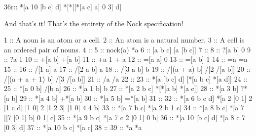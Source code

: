 \begin{code}
36r::    *[a 10 [b c] d]  *[*[[*[a c] a] 0 3] d]
\end{code}

And that's it! That's the entirety of the Nock specification! 

\begin{code}
1  ::    A noun is an atom or a cell.
2  ::    An atom is a natural number.
3  ::    A cell is an ordered pair of nouns.
4  ::
5  ::    nock(a)          *a
6  ::    [a b c]          [a [b c]]
7  ::
8  ::    ?[a b]           0
9  ::    ?a               1
10 ::    +[a b]           +[a b]
11 ::    +a               1 + a
12 ::    =[a a]           0
13 ::    =[a b]           1
14 ::    =a               =a
15 ::
16 ::    /[1 a]           a
17 ::    /[2 a b]         a
18 ::    /[3 a b]         b
19 ::    /[(a + a) b]     /[2 /[a b]]
20 ::    /[(a + a + 1) b] /[3 /[a b]]
21 ::    /a               /a
22 ::
23 ::    *[a [b c] d]     [*[a b c] *[a d]]
24 ::
25 ::    *[a 0 b]         /[b a]
26 ::    *[a 1 b]         b
27 ::    *[a 2 b c]       *[*[a b] *[a c]]
28 ::    *[a 3 b]         ?*[a b]
29 ::    *[a 4 b]         +*[a b]
30 ::    *[a 5 b]         =*[a b]
31 ::
32 ::    *[a 6 b c d]     *[a 2 [0 1] 2 [1 c d] [1 0] 2 [1 2 3] [1 0] 4 4 b]
33 ::    *[a 7 b c]       *[a 2 b 1 c]
34 ::    *[a 8 b c]       *[a 7 [[7 [0 1] b] 0 1] c]
35 ::    *[a 9 b c]       *[a 7 c 2 [0 1] 0 b]
36 ::    *[a 10 [b c] d]  *[a 8 c 7 [0 3] d]
37 ::    *[a 10 b c]      *[a c]
38 ::
39 ::    *a               *a
\end{code}
